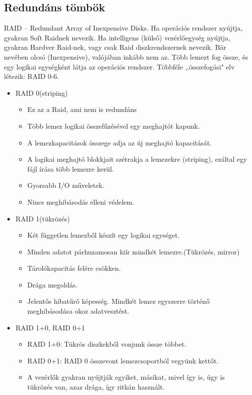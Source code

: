 \documentclass[margin=0px]{article}
\begin{document}
	\subsection{Redundáns tömbök}
	
	RAID -- Redundant Array of Inexpensive Disks. Ha operációs rendszer nyújtja, gyakran Soft Raidnek nevezik. Ha intelligens (külső) vezérlőegység nyújtja, gyakran Hardver Raid-nek, vagy csak Raid diszkrendszernek nevezik. Bár nevében olcsó (Inexpensive), valójában inkább nem az. Több lemezt fog össze, és egy logikai egységként látja az operációs rendszer. Többféle ,,összefogási" elv létezik: RAID 0-6.
	\begin{itemize}
		\item RAID 0(striping)
		\begin{itemize}
			\item Ez az a Raid, ami nem is redundáns
			\item Több lemez logikai összefűzésével egy meghajtót kapunk.
			\item A lemezkapacitások összege adja az új meghajtó kapacitását.
			\item A logikai meghajtó blokkjait szétrakja a lemezekre (striping), ezáltal egy fájl írása több lemezre kerül.
			\item Gyorsabb I/O műveletek.
			\item Nincs meghibásodás elleni védelem.
		\end{itemize}
		\item RAID 1(tükrözés)
		\begin{itemize}
			\item Két független lemezből készít egy logikai egységet.
			\item Minden adatot párhuzamosan kiír mindkét lemezre.(Tükrözés, mirror)
			\item Tárolókapacitás felére csökken.
			\item Drága megoldás.
			\item Jelentős hibatűrő képesség. Mindkét lemez egyszerre történő meghibásodása okoz adatvesztést.
		\end{itemize}
		\item RAID 1+0, RAID 0+1
		\begin{itemize}
			\item RAID 1+0: Tükrös diszkekből vonjunk össze többet.
			\item RAID 0+1: RAID 0 összevont lemezcsoportból vegyünk kettőt.
			\item A vezérlők gyakran nyújtják egyiket, másikat, mivel így is, úgy is tükrözés van, azaz drága, így ritkán használt.

\end{itemize}
\end{itemize}
\end{document}
